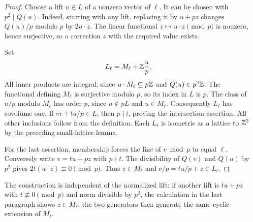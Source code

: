 \begin{proof}
Choose a lift $u\in L$ of a nonzero vector of $\ell$. It can be chosen
with $p^2\mid Q(u)$. Indeed, starting with any lift, replacing it by
$u+pz$ changes $Q(u)/p$ modulo $p$ by $2u\cdot z$. The linear
functional $z\mapsto u\cdot z\pmod p$ is nonzero, hence surjective,
so a correction $z$ with the required value exists.

Set
\[
 L_\ell=M_\ell+\mathbb Z\frac up.
\]
All inner products are integral, since $u\cdot M_\ell\subseteq p\mathbb Z$
and $Q(u)\in p^2\mathbb Z$. The functional defining $M_\ell$ is surjective
modulo $p$, so its index in $L$ is $p$. The class of $u/p$ modulo
$M_\ell$ has order $p$, since $u\notin pL$ and $u\in M_\ell$.
Consequently $L_\ell$ has covolume one. If $m+tu/p\in L$, then
$p\mid t$, proving the intersection assertion. All other inclusions
follow from the definition. Each $L_\ell$ is isometric as a lattice
to $\mathbb Z^3$ by the preceding small-lattice lemma.

For the last assertion, membership forces the line of $v\bmod p$
to equal $\ell$. Conversely write $v=tu+pz$ with $p\nmid t$.
The divisibility of $Q(v)$ and $Q(u)$ by $p^2$ gives
$2t(u\cdot z)\equiv0\pmod p$. Thus $z\in M_\ell$ and
$v/p=tu/p+z\in L_\ell$.
\end{proof}

The construction is independent of the normalized lift: if another lift
is $tu+pz$ with $t\not\equiv0\pmod p$ and norm divisible by $p^2$,
the calculation in the last paragraph shows $z\in M_\ell$; the two
generators then generate the same cyclic extension of $M_\ell$.

